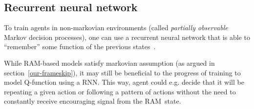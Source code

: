 \subsection{Recurrent neural network}
To train agents in non-markovian environments (called \emph{partially observable} Markov decision processes), one can use a recurrent neural network that is able to ``remember'' some function of the previous states~\cite{minecraft-pomdp}.

While RAM-based models satisfy markovian assumption (as argued in section~\ref{our-frameskip}), it may still be beneficial to the progress of training to model Q-function using a RNN. This way, agent could e.g. decide that it will be repeating a given action or following a pattern of actions without the need to constantly receive encouraging signal from the RAM~state.
